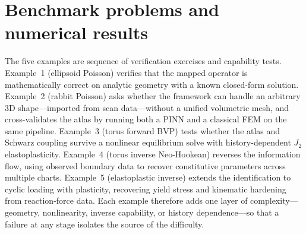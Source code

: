 \documentclass[sort&compress]{svjour3} %
\begin{document}
\section{Benchmark problems and numerical results}
\label{sec:benchmark_formulations}

The five examples are sequence of verification exercises and capability tests. Example~1 (ellipsoid Poisson) verifies that the mapped operator is mathematically correct on analytic geometry with a known closed-form solution. Example~2 (rabbit Poisson) asks whether the framework can handle an arbitrary 3D shape---imported from scan data---without a unified volumetric mesh, and cross-validates the atlas by running both a PINN and a classical FEM on the same pipeline. Example~3 (torus forward BVP) tests whether the atlas and Schwarz coupling survive a nonlinear equilibrium solve with history-dependent $J_2$ elastoplasticity. Example~4 (torus inverse Neo-Hookean) reverses the information flow, using observed boundary data to recover constitutive parameters across multiple charts. Example~5 (elastoplastic inverse) extends the identification to cyclic loading with plasticity, recovering yield stress and kinematic hardening from reaction-force data. Each example therefore adds one layer of complexity---geometry, nonlinearity, inverse capability, or history dependence---so that a failure at any stage isolates the source of the difficulty.


\end{document}
